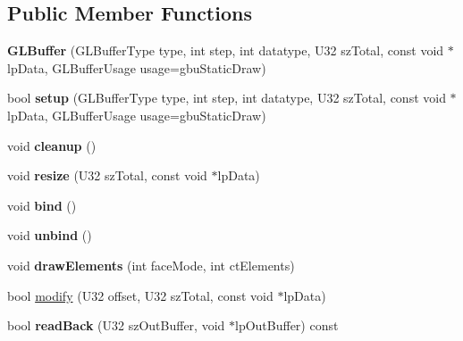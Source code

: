 \subsection*{Public Member Functions}
\begin{DoxyCompactItemize}
\item 
\hypertarget{classps_1_1opengl_1_1GLBuffer_a97b5c0b62050c944549757c55ba5c633}{}{\bfseries G\+L\+Buffer} (G\+L\+Buffer\+Type type, int step, int datatype, U32 sz\+Total, const void $\ast$lp\+Data, G\+L\+Buffer\+Usage usage=gbu\+Static\+Draw)\label{classps_1_1opengl_1_1GLBuffer_a97b5c0b62050c944549757c55ba5c633}

\item 
\hypertarget{classps_1_1opengl_1_1GLBuffer_a662528800299731eba4a9d19b7a1624a}{}bool {\bfseries setup} (G\+L\+Buffer\+Type type, int step, int datatype, U32 sz\+Total, const void $\ast$lp\+Data, G\+L\+Buffer\+Usage usage=gbu\+Static\+Draw)\label{classps_1_1opengl_1_1GLBuffer_a662528800299731eba4a9d19b7a1624a}

\item 
\hypertarget{classps_1_1opengl_1_1GLBuffer_afc98042ce97174bd0b732719f74bd841}{}void {\bfseries cleanup} ()\label{classps_1_1opengl_1_1GLBuffer_afc98042ce97174bd0b732719f74bd841}

\item 
\hypertarget{classps_1_1opengl_1_1GLBuffer_af2c0369caeab0038b380a729ec949327}{}void {\bfseries resize} (U32 sz\+Total, const void $\ast$lp\+Data)\label{classps_1_1opengl_1_1GLBuffer_af2c0369caeab0038b380a729ec949327}

\item 
\hypertarget{classps_1_1opengl_1_1GLBuffer_a8781382ead064acb42fdb80392e6b378}{}void {\bfseries bind} ()\label{classps_1_1opengl_1_1GLBuffer_a8781382ead064acb42fdb80392e6b378}

\item 
\hypertarget{classps_1_1opengl_1_1GLBuffer_ad715c58d6b17254c5653dc6c778ff5b5}{}void {\bfseries unbind} ()\label{classps_1_1opengl_1_1GLBuffer_ad715c58d6b17254c5653dc6c778ff5b5}

\item 
\hypertarget{classps_1_1opengl_1_1GLBuffer_aaf21827dfc8a3f66b5a61d7881a32745}{}void {\bfseries draw\+Elements} (int face\+Mode, int ct\+Elements)\label{classps_1_1opengl_1_1GLBuffer_aaf21827dfc8a3f66b5a61d7881a32745}

\item 
bool \hyperlink{classps_1_1opengl_1_1GLBuffer_a0341f4338ac221c8adab5106fd6494a6}{modify} (U32 offset, U32 sz\+Total, const void $\ast$lp\+Data)
\item 
\hypertarget{classps_1_1opengl_1_1GLBuffer_a50eb260cfbb1faa3cc362174dce1bf92}{}bool {\bfseries read\+Back} (U32 sz\+Out\+Buffer, void $\ast$lp\+Out\+Buffer) const \label{classps_1_1opengl_1_1GLBuffer_a50eb260cfbb1faa3cc362174dce1bf92}


\end{DoxyCompactItemize}
